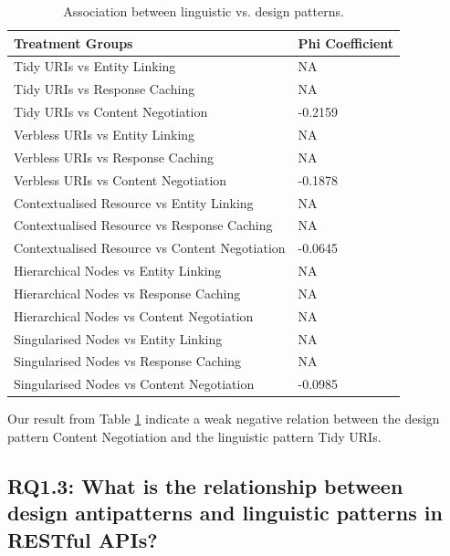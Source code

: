\documentclass[a4paper,12pt]{article}
\begin{document}
\begin{table}[ht!]
    \centering
    \begin{tabular}{|p{90mm}|p{50mm}|}
\hline \textbf{Treatment Groups} & \textbf{Phi Coefficient} 
\\ \hline 
Tidy URIs vs Entity Linking & NA
\\ \hline
Tidy URIs vs Response Caching & NA
\\ \hline
Tidy URIs vs Content Negotiation & -0.2159
\\ \hline
Verbless URIs vs Entity Linking & NA
\\ \hline
Verbless URIs vs Response Caching & NA
\\ \hline
Verbless URIs vs Content Negotiation & -0.1878
\\ \hline
Contextualised Resource vs Entity Linking & NA
\\ \hline
Contextualised Resource vs Response Caching & NA
\\ \hline
Contextualised Resource vs Content Negotiation & -0.0645
\\ \hline
Hierarchical Nodes vs Entity Linking & NA
\\ \hline
Hierarchical Nodes vs Response Caching & NA
\\ \hline
Hierarchical Nodes vs Content Negotiation & NA
\\ \hline
Singularised Nodes vs Entity Linking & NA
\\ \hline
Singularised Nodes vs Response Caching & NA
\\ \hline
Singularised Nodes vs Content Negotiation & -0.0985
\\ \hline
    \end{tabular}
    \caption{Association between linguistic vs. design patterns.}
    \label{tab:Linguistic vs design patterns}
\end{table}

\clearpage

Our result from Table \ref{tab:Linguistic vs design patterns} indicate a weak negative relation between the design pattern Content Negotiation and the linguistic pattern Tidy URIs. 

\subsection{\textbf{RQ1.3:} What is the relationship between design antipatterns and linguistic patterns in RESTful APIs?}
\end{document}
